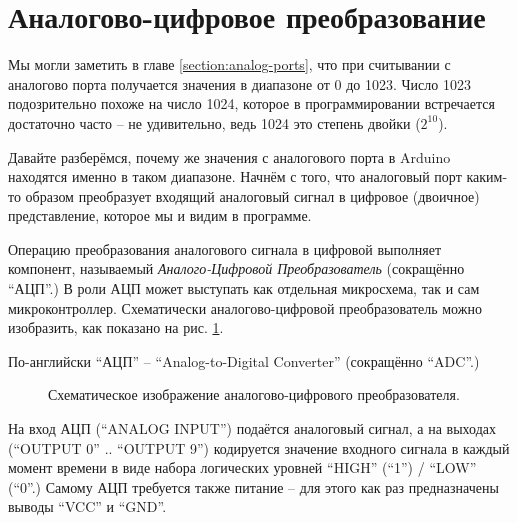 \documentclass[../sparc.tex]{subfiles}
\begin{document}
\section{Аналогово-цифровое преобразование}

Мы могли заметить в главе \ref{section:analog-ports}, что при считывании с
аналогово порта получается значения в диапазоне от 0 до 1023.  Число 1023
подозрительно похоже на число 1024, которое в программировании встречается
достаточно часто -- не удивительно, ведь 1024 это степень двойки ($2^{10}$).

Давайте разберёмся, почему же значения с аналогового порта в Arduino находятся
именно в таком диапазоне.  Начнём с того, что аналоговый порт каким-то образом
преобразует входящий аналоговый сигнал в цифровое (двоичное) представление,
которое мы и видим в программе.

Операцию преобразования аналогового сигнала в цифровой выполняет компонент,
называемый \emph{Аналого-Цифровой Преобразователь} (сокращённо ``АЦП''.)  В роли
АЦП может выступать как отдельная микросхема, так и сам микроконтроллер.
Схематически аналогово-цифровой преобразователь можно изобразить, как показано
на рис. \ref{fig:adc-schematics}.

По-английски ``АЦП'' -- ``Analog-to-Digital Converter'' (сокращённо ``ADC''.)

\begin{figure}[ht]
  \centering
  \caption{Схематическое изображение аналогово-цифрового преобразователя.}
  \label{fig:adc-schematics}
\end{figure}

На вход АЦП (``ANALOG INPUT'') подаётся аналоговый сигнал, а на выходах
(``OUTPUT 0'' .. ``OUTPUT 9'') кодируется значение входного сигнала в каждый
момент времени в виде набора логических уровней ``HIGH'' (``1'') / ``LOW''
(``0''.)  Самому АЦП требуется также питание -- для этого как раз предназначены
выводы ``VCC'' и ``GND''.
\end{document}
